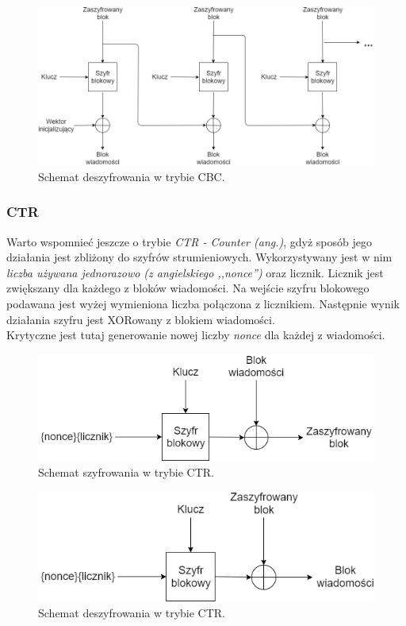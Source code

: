 \begin{figure}
    \centering
	\includegraphics[width=\textwidth]{content/images/cbc-dec-scheme}
    \caption{Schemat deszyfrowania w trybie CBC.}
\end{figure}

\subsubsection{CTR}
Warto wspomnieć jeszcze o trybie \textit{CTR - Counter (ang.)}, gdyż sposób jego działania jest zbliżony 
do szyfrów strumieniowych. Wykorzystywany jest w nim \textit{liczba używana jednorazowo (z angielskiego ,,nonce'')}
oraz licznik. Licznik jest zwiększany dla każdego z bloków wiadomości. 
Na wejście szyfru blokowego podawana jest wyżej wymieniona liczba połączona z licznikiem. Następnie wynik
działania szyfru jest XORowany z blokiem wiadomości. \\
Krytyczne jest tutaj generowanie nowej liczby \textit{nonce} dla każdej z wiadomości. 

\begin{figure}
    \centering
	\includegraphics[width=\textwidth]{content/images/ctr-enc-scheme}
    \caption{Schemat szyfrowania w trybie CTR.}
\end{figure}
\begin{figure}
    \centering
	\includegraphics[width=\textwidth]{content/images/ctr-dec-scheme}
    \caption{Schemat deszyfrowania w trybie CTR.}
\end{figure}

